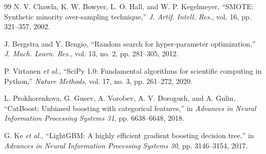 \documentclass[journal]{IEEEtran}
\begin{document}
\begin{thebibliography}{99}
N. V. Chawla, K. W. Bowyer, L. O. Hall, and W. P. Kegelmeyer, ``SMOTE: Synthetic minority over-sampling technique,'' \emph{J. Artif. Intell. Res.}, vol. 16, pp. 321--357, 2002.

J. Bergstra and Y. Bengio, ``Random search for hyper-parameter optimization,'' \emph{J. Mach. Learn. Res.}, vol. 13, no. 2, pp. 281--305, 2012.

P. Virtanen \emph{et al.}, ``SciPy 1.0: Fundamental algorithms for scientific computing in Python,'' \emph{Nature Methods}, vol. 17, no. 3, pp. 261--272, 2020.

L. Prokhorenkova, G. Gusev, A. Vorobev, A. V. Dorogush, and A. Gulin, ``CatBoost: Unbiased boosting with categorical features,'' in \emph{Advances in Neural Information Processing Systems 31}, pp. 6638--6648, 2018.

G. Ke \emph{et al.}, ``LightGBM: A highly efficient gradient boosting decision tree,'' in \emph{Advances in Neural Information Processing Systems 30}, pp. 3146--3154, 2017.

\end{thebibliography}
\end{document}
